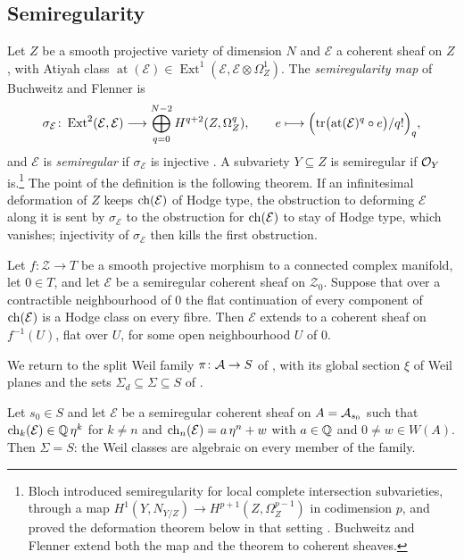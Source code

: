 \subsection{Semiregularity}\label{ssec:semireg}
Let $Z$ be a smooth projective variety of dimension $N$ and $\mathcal{E}$ a
coherent sheaf on $Z$, with Atiyah class
$\operatorname{at}(\mathcal{E})\in\operatorname{Ext}^{1}(\mathcal{E},
\mathcal{E}\otimes\Omega^{1}_{Z})$. The \emph{semiregularity map} of
Buchweitz and Flenner is
\[
  \sigma_{\mathcal{E}}\colon\operatorname{Ext}^{2}(\mathcal{E},\mathcal{E})
  \longrightarrow\bigoplus_{q=0}^{N-2}H^{q+2}(Z,\Omega^{q}_{Z}),\qquad
  e\longmapsto\Bigl(\operatorname{tr}\bigl(\operatorname{at}(\mathcal{E})^{q}
  \circ e\bigr)/q!\Bigr)_{q},
\]
and $\mathcal{E}$ is \emph{semiregular} if $\sigma_{\mathcal{E}}$ is
injective \cite{BF03}. A subvariety $Y\subseteq Z$ is semiregular if
$\mathcal{O}_{Y}$ is.\footnote{Bloch introduced semiregularity for local complete
intersection subvarieties, through a map $H^{1}(Y,N_{Y/Z})\to
H^{p+1}(Z,\Omega^{p-1}_{Z})$ in codimension $p$, and proved the deformation
theorem below in that setting \cite{Blo72}. Buchweitz and Flenner extend
both the map and the theorem to coherent sheaves.} The point of the
definition is the following theorem. If an infinitesimal deformation of $Z$
keeps $\operatorname{ch}(\mathcal{E})$ of Hodge type, the obstruction to deforming
$\mathcal{E}$ along it is sent by $\sigma_{\mathcal{E}}$ to the obstruction
for $\operatorname{ch}(\mathcal{E})$ to stay of Hodge type, which vanishes; injectivity
of $\sigma_{\mathcal{E}}$ then kills the first obstruction.

\begin{theorem}\label{thm:bf}
Let $f\colon\mathcal{Z}\to T$ be a smooth projective morphism to a connected
complex manifold, let $0\in T$, and let $\mathcal{E}$ be a semiregular
coherent sheaf on $\mathcal{Z}_{0}$. Suppose that over a contractible
neighbourhood of $0$ the flat continuation of every component of
$\operatorname{ch}(\mathcal{E})$ is a Hodge class on every fibre. Then $\mathcal{E}$
extends to a coherent sheaf on $f^{-1}(U)$, flat over $U$, for some open
neighbourhood $U$ of $0$.
\end{theorem}

We return to the split Weil family $\pi\colon\mathcal{A}\to S$ of
, with its global section $\xi$ of Weil planes and
the sets $\Sigma_{d}\subseteq\Sigma\subseteq S$ of .

\begin{proposition}\label{prop:semireg}
Let $s_{0}\in S$ and let $\mathcal{E}$ be a semiregular coherent sheaf on
$A=\mathcal{A}_{s_{0}}$ such that $\operatorname{ch}_{k}(\mathcal{E})\in\mathbb{Q}\,\eta^{k}$ for $k\ne
n$ and $\operatorname{ch}_{n}(\mathcal{E})=a\,\eta^{n}+w$ with $a\in\mathbb{Q}$ and $0\ne w\in
W(A)$. Then $\Sigma=S$: the Weil classes are algebraic on every member of
the family.
\end{proposition}

